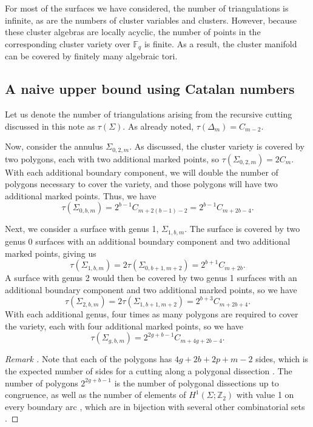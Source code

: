 \documentclass[reqno,12pt]{amsart}
\theoremstyle{definition}
\theoremstyle{remark}
\theoremstyle{remark}
\newenvironment{rem}{\refstepcounter{thm}\begin{proof}[Remark \emph{\thethm}]\renewcommand*{\qedsymbol}{\(\blacksquare\)}}{\end{proof}}
\numberwithin{equation}{section}
\begin{document}
For most of the surfaces we have considered, the number of triangulations is infinite, as are the numbers of cluster variables and clusters. However, because these cluster algebras are locally acyclic, the number of points in the corresponding cluster variety over $\mathbb{F}_q$ is finite. As a result, the cluster manifold can be covered by finitely many algebraic tori. 

\subsection{A naive upper bound using Catalan numbers}

Let us denote the number of triangulations arising from the recursive cutting discussed in this note as $\tau (\Sigma)$. As already noted, $\tau (\Delta_{m}) = C_{m-2}$. 

Now, consider the annulus $\Sigma_{0,2,m}$. As discussed, the cluster variety is covered by two polygons, each with two additional marked points, so $ \tau (\Sigma_{0,2,m}) = 2C_m .$ 
With each additional boundary component, we will double the number of polygons necessary to cover the variety, and those polygons will have two additional marked points. Thus, we have \[ \tau (\Sigma_{0,b,m}) = 2^{b-1} C_{m + 2(b-1) - 2} = 2^{b-1} C_{m + 2b - 4} .\]

Next, we consider a surface with genus 1, $\Sigma_{1,b,m}$. The surface is covered by two genus 0 surfaces with an additional boundary component and two additional marked points, giving us \[ \tau (\Sigma_{1,b,m}) = 2 \tau (\Sigma_{0,b+1,m+2}) = 2^{b+1} C_{m + 2b} .\]
A surface with genus 2 would then be covered by two genus 1 surfaces with an additional boundary component and two additional marked points, so we have \[ \tau (\Sigma_{2,b,m}) = 2 \tau (\Sigma_{1,b+1,m+2}) = 2^{b+3} C_{m + 2b + 4} .\]
With each additional genus, four times as many polygons are required to cover the variety, each with four additional marked points, so we have 
\begin{equation}
\tau (\Sigma_{g,b,m}) = 2^{2g+b-1} C_{m + 4g + 2b - 4}.\tag{$\star$}
\end{equation}

\begin{rem}
    Note that each of the polygons has $4g + 2b + 2p + m - 2$ sides, which is the expected number of sides for a cutting along a polygonal dissection \cite[Proposition 7.3]{BM25}. The number of polygons $2^{2g+b-1}$ is the number of polygonal dissections up to congruence, as well as the number of elements of $H^1 (\Sigma ; \mathbb{Z}_2)$ with value 1 on every boundary arc \cite[Proposition 7.10]{BM25}, which are in bijection with several other combinatorial sets \cite[Theorem A.1]{BM25}. 
\end{rem}
\end{document}
